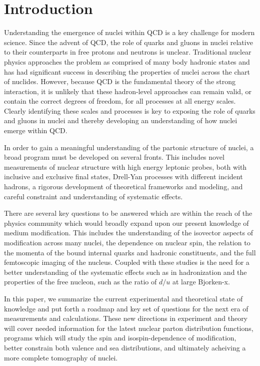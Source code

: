 \section{Introduction}


Understanding the emergence of nuclei within QCD is a key challenge for modern science.  Since the advent of QCD, the role of quarks and gluons in nuclei relative to their counterparts in free protons and neutrons is unclear.  Traditional nuclear physics approaches the problem as comprised of many body hadronic states and has had significant success in describing the properties of nuclei across the chart of nuclides. However, because QCD is the fundamental theory of the strong interaction, it is unlikely that these hadron-level approaches can remain valid, or contain the correct degrees of freedom, for all processes at all energy scales. Clearly identifying these scales and processes is key to exposing the role of quarks and gluons in nuclei and thereby developing an understanding of how nuclei emerge within QCD.

In order to gain a meaningful understanding of the partonic structure of nuclei, a broad program must be developed on several fronts.  This includes novel measurements of nuclear structure with high energy leptonic probes, both with inclusive and exclusive final states, Drell-Yan processes with different incident hadrons, a rigorous development of theoretical frameworks and modeling, and  careful constraint and understanding of systematic effects.

There are several key questions to be answered which are within the reach of the physics community which would broadly expand upon our present knowledge of medium modification.  This includes the understanding of the isovector aspects of modification across many nuclei, the dependence on nuclear spin, the relation to the momenta of the bound internal quarks and hadronic constituents, and the full femtoscopic imaging of the nucleus.  Coupled with these studies is the need for a better understanding of the systematic effects such as in hadronization and the properties of the free nucleon, such as the ratio of $d/u$ at large Bjorken-x. 

In this paper, we summarize the current experimental and theoretical state of knowledge and put forth a roadmap and key set of questions for the next era of measurements and calculations.  These new directions in experiment and theory will cover needed information for the latest nuclear parton distribution functions, programs which will study the spin and isospin-dependence of modification, better constrain both valence and sea distributions, and ultimately acheiving a more complete tomography of nuclei.

